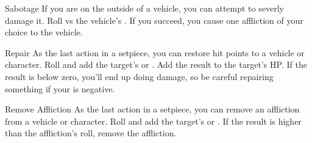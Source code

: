 \begin{describe}{Sabotage}
  If you are on the outside of a vehicle, you can attempt to severly damage it. Roll  vs the vehicle's . If you succeed, you cause one affliction of your choice to the vehicle.
\end{describe}

\hr

\begin{describe}{Repair}
  As the last action in a setpiece, you can restore hit points to a vehicle or character. Roll  and add the target's  or . Add the result to the target's HP. If the result is below zero, you'll end up doing damage, so be careful repairing something if your  is negative.
\end{describe}

\begin{describe}{Remove Affliction}
  As the last action in a setpiece, you can remove an affliction from a vehicle or character. Roll  and add the target's  or . If the result is higher than the affliction's  roll, remove the affliction.
\end{describe}
